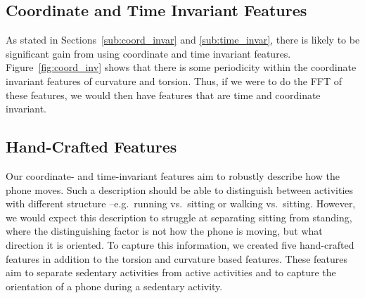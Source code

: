\subsection{Coordinate and Time Invariant Features}
\label{sub:coor_time_invar}

As stated in Sections~\ref{sub:coord_invar} and \ref{sub:time_invar}, there is likely to be significant gain from using coordinate and time invariant features. Figure~\ref{fig:coord_inv} shows that there is some periodicity within the coordinate invariant features of curvature and torsion. Thus, if we were to do the FFT of these features, we would then have features that are time and coordinate invariant.

\subsection{Hand-Crafted Features}
\label{sub:hc_feats}
Our coordinate- and time-invariant features aim to robustly describe how the phone moves. Such a description should be able to distinguish between activities with different structure --e.g.\ running vs.\ sitting or walking vs.\ sitting. However, we would expect this description to struggle at separating sitting from standing, where the distinguishing factor is not how the phone is moving, but what direction it is oriented. To capture this information, we created five hand-crafted features in addition to the torsion and curvature based features. These features aim to separate sedentary activities from active activities and to capture the orientation of a phone during a sedentary activity.  
